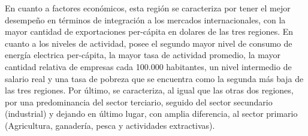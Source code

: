 \documentclass[12pt,a4paper]{article}
\begin{document}
En cuanto a factores económicos, esta región se caracteriza por tener el mejor desempeño en términos de integración a los mercados internacionales, con la mayor cantidad de exportaciones per-cápita en dolares de las tres regiones. En cuanto a los niveles de actividad, posee el segundo mayor nivel de consumo  de energía electrica per-cápita, la mayor tasa de actividad promedio, la mayor cantidad relativa de empresas cada 100.000 habitantes, un nivel intermedio de salario real  y una tasa de pobreza que se encuentra como la segunda más baja de las tres regiones. Por último, se caracteriza, al igual que las otras dos regiones, por una predominancia del sector terciario, seguido del sector secundario (industrial) y dejando en último lugar, con amplia diferencia, al sector primario (Agricultura, ganadería, pesca y actividades extractivas).
\end{document}
